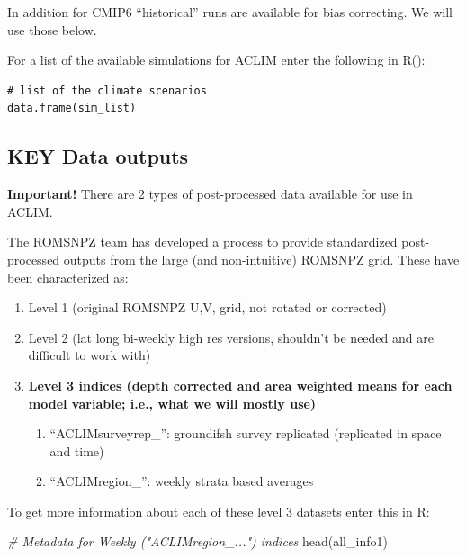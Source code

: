 \documentclass[
]{article}
\newenvironment{Shaded}{\begin{snugshade}}{\end{snugshade}}
\newcommand{\CommentTok}[1]{\textcolor[rgb]{0.56,0.35,0.01}{\textit{#1}}}
\newcommand{\FunctionTok}[1]{\textcolor[rgb]{0.00,0.00,0.00}{#1}}
\newcommand{\NormalTok}[1]{#1}
\providecommand{\tightlist}{%
  \setlength{\itemsep}{0pt}\setlength{\parskip}{0pt}}
\begin{document}
In addition for CMIP6 ``historical'' runs are available for bias
correcting. We will use those below.

For a list of the available simulations for ACLIM enter the following in
R():

\begin{verbatim}
# list of the climate scenarios
data.frame(sim_list)
\end{verbatim}

\hypertarget{key-data-outputs}{%
\subsection{KEY Data outputs}\label{key-data-outputs}}

\textbf{Important!} There are 2 types of post-processed data available
for use in ACLIM.

The ROMSNPZ team has developed a process to provide standardized
post-processed outputs from the large (and non-intuitive) ROMSNPZ grid.
These have been characterized as:

\begin{enumerate}
\def\labelenumi{\arabic{enumi}.}
\tightlist
\item
  Level 1 (original ROMSNPZ U,V, grid, not rotated or corrected)\\
\item
  Level 2 (lat long bi-weekly high res versions, shouldn't be needed and
  are difficult to work with)\\
\item
  \textbf{Level 3 indices (depth corrected and area weighted means for
  each model variable; i.e., what we will mostly use) }

  \begin{enumerate}
  \def\labelenumii{\alph{enumii}.}
  \tightlist
  \item
    ``ACLIMsurveyrep\_'': groundifsh survey replicated (replicated in
    space and time)
  \item
    ``ACLIMregion\_'': weekly strata based averages
  \end{enumerate}
\end{enumerate}

To get more information about each of these level 3 datasets enter this
in R:

\begin{Shaded}
\begin{Highlighting}[]
    \CommentTok{\# Metadata for Weekly ("ACLIMregion\_...") indices}
    \FunctionTok{head}\NormalTok{(all\_info1)}
\end{Highlighting}
\end{Shaded}
\end{document}
